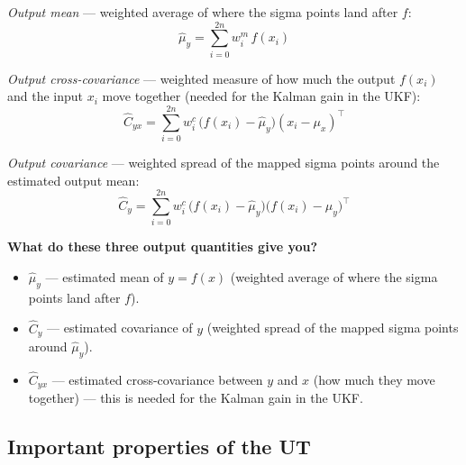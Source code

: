 \documentclass[12pt, a4paper]{article}
\begin{document}
\medskip
\textit{Output mean} --- weighted average of where the sigma points
land after $f$:
\[
  \hat{\mu}_y = \sum_{i=0}^{2n} w_i^m\, f(x_i)
\]

\textit{Output cross-covariance} --- weighted measure of how much
the output $f(x_i)$ and the input $x_i$ move together
(needed for the Kalman gain in the UKF):
\[
  \hat{C}_{yx} = \sum_{i=0}^{2n} w_i^c\,
    \bigl(f(x_i) - \hat{\mu}_y\bigr)(x_i - \mu_x)^\top
\]

\textit{Output covariance} --- weighted spread of the mapped sigma
points around the estimated output mean:
\[
  \hat{C}_y = \sum_{i=0}^{2n} w_i^c\,
    \bigl(f(x_i) - \hat{\mu}_y\bigr)\bigl(f(x_i) - \hat{\mu}_y\bigr)^\top
\]

\begin{notebox}
  \textbf{What do these three output quantities give you?}
  \begin{itemize}[leftmargin=1.4em, topsep=2pt]
    \item $\hat{\mu}_y$ --- estimated mean of $y = f(x)$
          (weighted average of where the sigma points land after $f$).
    \item $\hat{C}_y$ --- estimated covariance of $y$
          (weighted spread of the mapped sigma points around $\hat{\mu}_y$).
    \item $\hat{C}_{yx}$ --- estimated cross-covariance between $y$
          and $x$ (how much they move together) ---
          this is needed for the Kalman gain in the UKF.
  \end{itemize}
\end{notebox}

\subsection*{Important properties of the UT}
\end{document}
